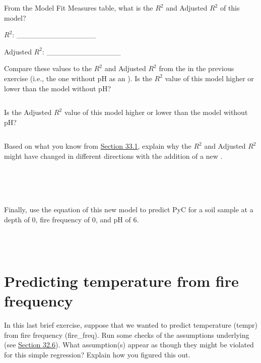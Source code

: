 \documentclass[
  openany]{krantz}
\begin{document}
From the Model Fit Measures table, what is the \(R^{2}\) and Adjusted \(R^{2}\) of this model?

\(R^{2}\): \_\_\_\_\_\_\_\_\_\_\_\_\_\_\_

Adjusted \(R^{2}\): \_\_\_\_\_\_\_\_\_\_\_\_\_\_

Compare these values to the \(R^{2}\) and Adjusted \(R^{2}\) from the  in the previous exercise (i.e., the one without pH as an ).
Is the \(R^{2}\) value of this model higher or lower than the  model without pH?

\begin{verbatim}
\end{verbatim}

Is the Adjusted \(R^{2}\) value of this model higher or lower than the  model without pH?

\begin{verbatim}
\end{verbatim}

Based on what you know from \protect\hyperlink{adjusted-coefficient-of-determination}{Section 33.1}, explain why the \(R^{2}\) and Adjusted \(R^{2}\) might have changed in different directions with the addition of a new .

\begin{verbatim}




\end{verbatim}

Finally, use the equation of this new model to predict PyC for a soil sample at a depth of 0, fire frequency of 0, and pH of 6.

\begin{verbatim}



\end{verbatim}

\hypertarget{predicting-temperature-from-fire-frequency}{%
\section{Predicting temperature from fire frequency}\label{predicting-temperature-from-fire-frequency}}

In this last brief exercise, suppose that we wanted to predict temperature (tempr) from fire frequency (fire\_freq).
Run some checks of the assumptions underlying  (see \protect\hyperlink{regression-assumptions}{Section 32.6}).
What assumption(s) appear as though they might be violated for this simple regression?
Explain how you figured this out.
\end{document}
